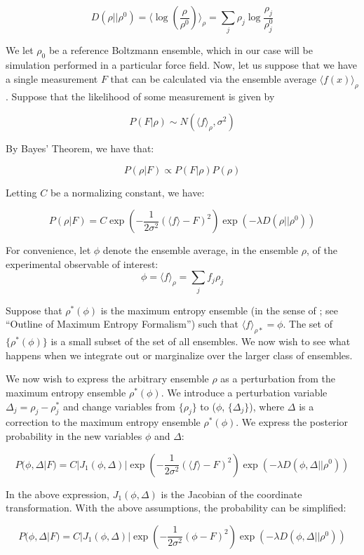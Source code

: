 \documentclass[12pt]{article}
\begin{document}
$$D(\rho || \rho^0) = \langle \log(\frac{\rho}{\rho^0})\rangle_\rho = \sum_j \rho_j \log \frac{\rho_j}{\rho^0_j}$$

We let $\rho_0$ be a reference Boltzmann ensemble, which in our case will be simulation performed in a particular force field. Now, let us suppose that we have a single measurement $F$ that can be calculated via the ensemble average $\langle f(x) \rangle_\rho$.  Suppose that the likelihood of some measurement is given by

$$P(F|\rho) \sim N(\langle f\rangle_\rho, \sigma^2)$$

By Bayes' Theorem, we have that:

$$P(\rho | F) \propto P(F | \rho) P(\rho)$$

Letting $C$ be a normalizing constant, we have:

$$P(\rho | F) = C \exp(-\frac{1}{2\sigma^2} (\langle f \rangle - F)^2) \exp(-\lambda D(\rho || \rho^0))$$

For convenience, let $\phi$ denote the ensemble average, in the ensemble $\rho$, of the experimental observable of interest: 
$$\phi = \langle f \rangle_\rho = \sum_j f_j \rho_j$$

Suppose that $\rho^*(\phi)$ is the maximum entropy ensemble (in the sense of \cite{chodera2012}; see ``Outline of Maximum Entropy Formalism'') such that $\langle f \rangle_{\rho*} = \phi$.  The set of $\{ \rho^*(\phi)\}$ is a small subset of the set of all ensembles.  We now wish to see what happens when we integrate out or marginalize over the larger class of ensembles.  

We now wish to express the arbitrary ensemble $\rho$ as a perturbation from the maximum entropy ensemble $\rho^*(\phi)$.  We introduce a perturbation variable $\Delta_j = \rho_j - \rho^*_j$ and change variables from $\{\rho_j\}$ to ($\phi$, $\{\Delta_j \}$), where $\Delta$ is a correction to the maximum entropy ensemble $\rho^*(\phi)$.  We express the posterior probability in the new variables $\phi$ and $\Delta$:

$$P(\phi, \Delta | F) = C |J_1(\phi, \Delta)| \exp(-\frac{1}{2\sigma^2} (\langle f \rangle - F)^2) \exp(-\lambda D(\phi, \Delta|| \rho^0)) $$

In the above expression, $J_1(\phi, \Delta)$ is the Jacobian of the coordinate transformation.  With the above assumptions, the probability can be simplified:

$$P(\phi, \Delta | F) = C |J_1(\phi, \Delta)| \exp(-\frac{1}{2\sigma^2} (\phi - F)^2) \exp(-\lambda D(\phi, \Delta|| \rho^0)) $$
\end{document}
